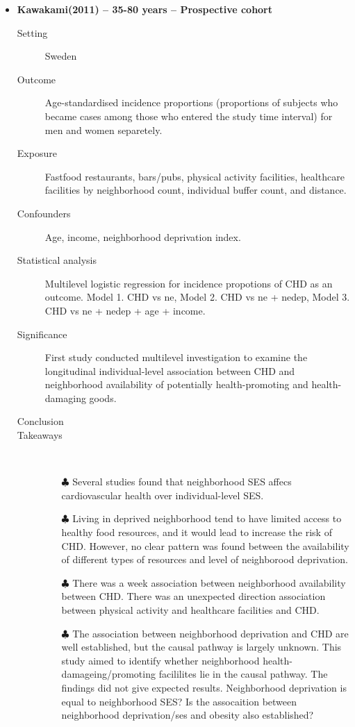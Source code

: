 \documentclass{article}
\begin{document}
\begin{itemize}
\begin{description}
		\end{description}
		
\newpage
\item{\bf Kawakami(2011) -- 35-80 years  -- Prospective cohort} 
		\begin{description}
			\item[Setting] Sweden
			\item[Outcome] Age-standardised incidence proportions (proportions of subjects who became cases among those who entered the study time interval) for men and women separetely. 
			\item[Exposure] Fastfood restaurants, bars/pubs, physical activity facilities, healthcare facilities by neighborhood count, individual buffer count, and distance. 
			\item[Confounders] Age, income, neighborhood deprivation index. 
			\item[Statistical analysis] Multilevel logistic regression for incidence propotions of CHD as an outcome. Model 1. CHD vs ne, Model 2. CHD vs ne + nedep, Model 3. CHD vs ne + nedep + age + income.  
			\item[Significance] First study conducted multilevel investigation to examine the longitudinal individual-level association between CHD and neighborhood availability of potentially health-promoting and health-damaging goods. 
			\item[Conclusion] 
			\item[Takeaways] \mbox{}\\
				\begin{itemize}
					\item[$\clubsuit$] Several studies found that neighborhood SES affecs cardiovascular health over individual-level SES.
					\item[$\clubsuit$] Living in deprived neighborhood tend to have limited access to healthy food resources, and it would lead to increase the risk of CHD. However, no clear pattern was found between the availability of different types of resources and level of neighborood deprivation. 
					\item[$\clubsuit$] There was a week association between neighborhood availability between CHD. There was an unexpected direction association between physical activity and healthcare facilities and CHD. 
					\item[$\clubsuit$] The association between neighborhood deprivation and CHD are well established, but the causal pathway is largely unknown. This study aimed to identify whether neighborhood health-damageing/promoting facililites lie in the causal pathway. The findings did not give expected results. Neighborhood deprivation is equal to neighborhood SES? Is the assocaition between neighborhood deprivation/ses and obesity also established? 
				\end{itemize} 
			

\end{description}
\end{itemize}
\end{document}
